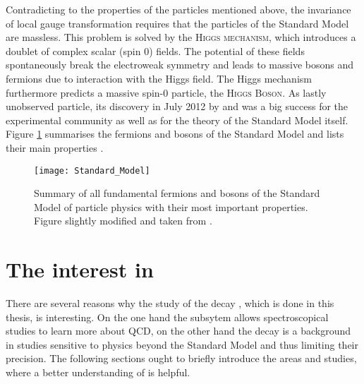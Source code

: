 Contradicting to the properties of the particles mentioned above, the invariance of local gauge transformation requires that the particles of the Standard Model are massless.
This problem is solved by the \textsc{Higgs mechanism}, which introduces a doublet of complex scalar (spin 0) fields.
The potential of these fields spontaneously break the electroweak symmetry and leads to massive bosons and fermions due to interaction with the Higgs field.
The Higgs mechanism furthermore predicts a massive spin-0 particle, the \textsc{Higgs Boson}.
As lastly unobserved particle, its discovery in July 2012 by \atlas \cite{Higgs_ATLAS} and \cms \cite{Higgs_CMS} was a big success for the experimental community as well as for the theory of the Standard Model itself. 
Figure \ref{fig:SM} summarises the fermions and bosons of the Standard Model and lists their main properties \cite{Perkins_HEP, Burgess_SM, Meissner}.
\begin{figure}[tb]
    \centering
	\texttt{[image: Standard\_Model]}	
	\caption{Summary of all fundamental fermions and bosons of the Standard Model of particle physics with their most important properties. Figure slightly modified and taken from \cite{SM_figure}.}
	\label{fig:SM}
\end{figure}

\section{The interest in \LbToDpmunuX}
There are several reasons why the study of the decay \LbToDpmunuX, which is done in this thesis, is interesting.
On the one hand the \Dz\proton subsytem allows spectroscopical studies to learn more about QCD, on the other hand the decay is a background in studies sensitive to physics beyond the Standard Model and thus limiting their precision.
The following sections ought to briefly introduce the areas and studies, where a better understanding of \LbToDpmunuX is helpful.

